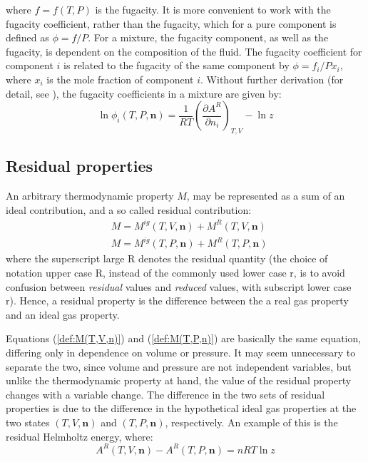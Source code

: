 \documentclass[english]{../thermomemo/thermomemo}
\numberwithin{equation}{section}
\newcommand*{\pder}[2]{\left(\frac{\partial #1}{\partial #2}\right)}
\newcommand*{\reff}[1]{(\ref{#1})}
\begin{document}
where $f = f(T,P)$ is the fugacity. It is more convenient to work with the fugacity coefficient, rather than the fugacity, which for a pure component is defined as $\phi = f/P$. For a mixture, the fugacity component, as well as the fugacity, is dependent on the composition of the fluid. The fugacity coefficient for component $i$ is related to the fugacity of the same component by $\phi = f_i/P x_i$, where $x_i$ is the mole fraction of component $i$. Without further derivation (for detail, see \cite{MM}), the fugacity coefficients in a mixture are given by:
\begin{equation}
\label{def:lnphi}
\ln \phi_i (T,P,\textbf{n}) = \frac{1}{RT} \pder{A^R}{n_i}_{T,V} - \ln z
\end{equation}

\subsection{Residual properties}
An arbitrary thermodynamic property $M$,  may be represented as a sum of an ideal contribution, and a so called residual contribution:
\begin{align}
\label{def:M(T,V,n)}
& M = M^{ig}(T,V,\textbf{n}) + M^R(T,V,\textbf{n}) \\
\label{def:M(T,P,n)}
& M = M^{ig}(T,P,\textbf{n}) + M^R(T,P,\textbf{n}) 
\end{align}
where the superscript large R denotes the residual quantity (the choice of notation upper case R, instead of the commonly used lower case r, is to avoid confusion between \textit{residual} values and \textit{reduced} values, with subscript lower case r). Hence, a residual property is the difference between the a real gas property and an ideal gas property.

Equations \reff{def:M(T,V,n)} and \reff{def:M(T,P,n)} are basically the same equation, differing only in dependence on volume or pressure. It may seem unnecessary  to separate the two, since volume and pressure are not independent variables, but unlike the thermodynamic property at hand, the value of the residual property changes with a variable change. The difference in the two sets of residual properties is due to the difference in the hypothetical ideal gas properties at the two states $(T,V,\textbf{n})$ and $(T,P,\textbf{n})$, respectively. An example of this is the residual Helmholtz energy, where:
\begin{equation}
\label{eq:A^R(T,V,n)-A^R(T,P,n)}
A^R(T,V,\textbf{n}) - A^R(T,P,\textbf{n}) = nRT \ln z
\end{equation}
\end{document}
